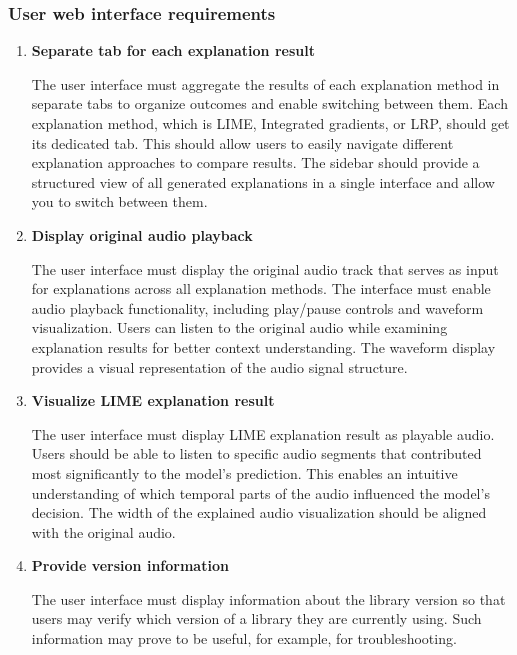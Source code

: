 \documentclass[
    bindingoffset=5mm,  %
    footnoteindent=3mm, %
    hyphenation=true    %
]{src/wut-thesis}
\begin{document}
\subsubsection{User web interface requirements}
    \begin{enumerate}[itemsep=1\baselineskip]
    \item \textbf{Separate tab for each explanation result}

            The user interface must aggregate the results of each explanation method in separate tabs to organize
        outcomes and enable switching between them. Each explanation method, which is LIME, Integrated gradients, or LRP,
        should get its dedicated tab. This should allow users to easily navigate different explanation approaches
        to compare results. The sidebar should provide a structured view of all generated explanations in a single
        interface and allow you to switch between them.

    \item \textbf{Display original audio playback}

        The user interface must display the original audio track that serves as input for explanations across all
    explanation methods. The interface must enable audio playback functionality, including play/pause controls and
    waveform visualization. Users can listen to the original audio while examining explanation results for better
    context understanding. The waveform display provides a visual representation of the audio signal structure.

    \item \textbf{Visualize LIME explanation result}

        The user interface must display LIME explanation result as playable audio.
    Users should be able to listen to specific audio segments that contributed most significantly
    to the model's prediction. This enables an intuitive understanding of which temporal parts of
    the audio influenced the model's decision. The width of the explained audio visualization
    should be aligned with the original audio.

    \item \textbf{Provide version information}

        The user interface must display information about the library version so that users may verify which
    version of a library they are currently using. Such information may prove to be useful,
    for example, for troubleshooting.


\end{enumerate}
\end{document}
